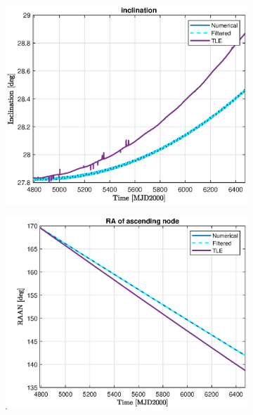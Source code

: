 \documentclass{article}
\begin{document}
\begin{figure}[H]
	\vspace{1cm} %
	\begin{subfigure}[b]{0.45\textwidth}
		\includegraphics[width=\textwidth]{i_TLE.eps}
		\caption{}
		\label{fig:10c}
	\end{subfigure}%
    \hfill
	\begin{subfigure}[b]{0.45\textwidth}
		\includegraphics[width=\textwidth]{RAAN_TLE.eps}
		\caption{}
		\label{fig:10d}
	\end{subfigure}%
	

\end{figure}
\end{document}
